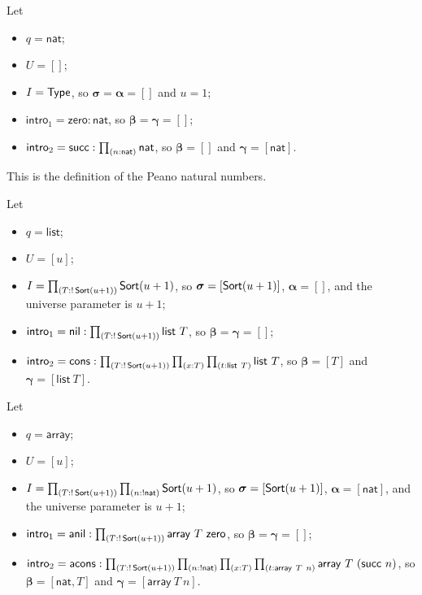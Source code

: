 \begin{eg}
	Let
	\begin{itemize}
		\item \( q = \mathsf{nat} \);
		\item \( U = [] \);
		\item \( I = \mathsf{Type} \), so \( \bm \sigma = \bm \alpha = [] \) and \( u = 1 \);
		\item \( \mathsf{intro}_1 = \mathsf{zero} : \mathsf{nat} \), so \( \bm \beta = \bm \gamma = [] \);
		\item \( \mathsf{intro}_2 = \mathsf{succ} : \prd{n:\mathsf{nat}} \mathsf{nat} \), so \( \bm \beta = [] \) and \( \bm \gamma = [\mathsf{nat}] \).
	\end{itemize}
	This is the definition of the Peano natural numbers.
\end{eg}
\begin{eg}[lists]
	Let
	\begin{itemize}
		\item \( q = \mathsf{list} \);
		\item \( U = [u] \);
		\item \( I = \prd{T:!\Sort (u + 1)} \Sort (u + 1) \), so \( \bm \sigma = [\operatorname{\mathsf{Sort}} (u + 1)] \), \( \bm \alpha = [] \), and the universe parameter is \( u + 1 \);
		\item \( \mathsf{intro}_1 = \mathsf{nil} : \prd{T:!\Sort (u + 1)} \mathsf{list}\ T \), so \( \bm \beta = \bm \gamma = [] \);
		\item \( \mathsf{intro}_2 = \mathsf{cons} : \prd{T:!\Sort (u + 1)}{x:T}{t:\mathsf{list}\ T} \mathsf{list}\ T \), so \( \bm\beta = [T] \) and \( \bm\gamma = [\mathsf{list}\ T] \).
	\end{itemize}
\end{eg}
\begin{eg}[arrays]
	Let
	\begin{itemize}
		\item \( q = \mathsf{array} \);
		\item \( U = [u] \);
		\item \( I = \prd{T:!\Sort (u + 1)}{n:!\mathsf{nat}} \Sort (u + 1) \), so \( \bm \sigma = [\operatorname{\mathsf{Sort}} (u + 1)] \), \( \bm \alpha = [\mathsf{nat}] \), and the universe parameter is \( u + 1 \);
		\item \( \mathsf{intro}_1 = \mathsf{anil} : \prd{T:!\Sort (u + 1)} \mathsf{array}\ T\ \mathsf{zero} \), so \( \bm \beta = \bm \gamma = [] \);
		\item \( \mathsf{intro}_2 = \mathsf{acons} : \prd{T:!\Sort (u + 1)}{n:!\mathsf{nat}}{x:T}{t:\mathsf{array}\ T\ n} \mathsf{array}\ T\ (\mathsf{succ}\ n) \), so \( \bm\beta = [\mathsf{nat}, T] \) and \( \bm\gamma = [\mathsf{array}\ T\ n] \).
	\end{itemize}
\end{eg}
